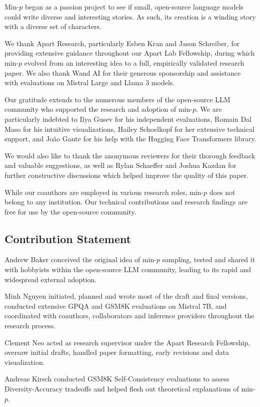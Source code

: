 \documentclass{article}
\begin{document}
Min-\( p \) began as a passion project to see if small, open-source language models could write diverse and interesting stories. As such, its creation is a winding story with a diverse set of characters.

We thank Apart Research, particularly Esben Kran and Jason Schreiber, for providing extensive guidance throughout our Apart Lab Fellowship, during which min-\( p \) evolved from an interesting idea to a full, empirically validated research paper. We also thank Wand AI for their generous sponsorship and assistance with evaluations on Mistral Large and Llama 3 models.

Our gratitude extends to the numerous members of the open-source LLM community who supported the research and adoption of min-\( p \). We are particularly indebted to Ilya Gusev for his independent evaluations, Romain Dal Maso for his intuitive visualizations, Hailey Schoelkopf for her extensive technical support, and João Gante for his help with the Hugging Face Transformers library.

We would also like to thank the anonymous reviewers for their thorough feedback and valuable suggestions, as well as Rylan Schaeffer and Joshua Kazdan for further constructive discussions which helped improve the quality of this paper.

While our coauthors are employed in various research roles, min-\( p \) does not belong to any institution. Our technical contributions and research findings are free for use by the open-source community.

\subsection*{Contribution Statement}

Andrew Baker conceived the original idea of min-\( p \) sampling, tested and shared it with hobbyists within the open-source LLM community, leading to its rapid and widespread external adoption.

Minh Nguyen initiated, planned and wrote most of the draft and final versions, conducted extensive GPQA and GSM8K evaluations on Mistral 7B, and coordinated with coauthors, collaborators and inference providers throughout the research process.

Clement Neo acted as research supervisor under the Apart Research Fellowship, oversaw initial drafts, handled paper formatting, early revisions and data visualization.

Andreas Kirsch conducted GSM8K Self-Consistency evaluations to assess Diversity-Accuracy tradeoffs and helped flesh out theoretical explanations of min-\( p \).
\end{document}
